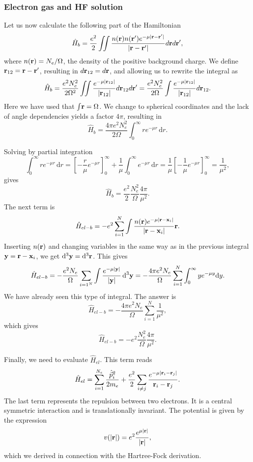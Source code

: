 \documentclass{beamer}
\begin{document}
\begin{frame}
\frametitle{Electron gas and HF solution}

\begin{block}{}
Let us now calculate the following part of the Hamiltonian
\[ \hat H_b = \frac{e^2}{2} \iint \frac{n({\bf r}) n({\bf r}')e^{-\mu|{\bf r} - {\bf r}'|}}{|{\bf r} - {\bf r}'|} d{\bf r} d{\bf r}' , 
\]
where $n({\bf r}) = N_e/\Omega$, the density of the positive background charge. We define ${\bf r}_{12} = {\bf r} - {\bf r}'$, resulting in $d{\bf r}_{12} = d{\bf r}$, and allowing us to rewrite the integral as
\[ 
\hat H_b = \frac{e^2 N_e^2}{2\Omega^2} \iint \frac{e^{-\mu |{\bf r}_{12}|}}{|{\bf r}_{12}|} d{\bf r}_{12} d{\bf r}' = \frac{e^2 N_e^2}{2\Omega} \int \frac{e^{-\mu |{\bf r}_{12}|}}{|{\bf r}_{12}|} d{\bf r}_{12} . 
\]
Here we have used that $\int \! {\bf r} = \Omega$. We change to spherical coordinates and the lack of angle 
dependencies yields a factor $4\pi$, resulting in
\[ 
\hat H_b = \frac{4\pi e^2 N_e^2}{2\Omega} \int_0^\infty re^{-\mu r} \, \mathrm{d} r . 
\]


Solving by partial integration
\[ \int_0^\infty re^{-\mu r} \, \mathrm{d} r = \left[ -\frac{r}{\mu} e^{-\mu r} \right]_0^\infty + \frac{1}{\mu} \int_0^\infty e^{-\mu r} \, \mathrm{d} r
= \frac{1}{\mu} \left[ - \frac{1}{\mu} e^{-\mu r} \right]_0^\infty = \frac{1}{\mu^2}, 
\]
gives
\[
\hat{H}_b = \frac{e^2}{2} \frac{N_e^2}{\Omega} \frac{4\pi}{\mu^2} .
\]
The next term is 
\[ 
\hat H_{el-b} = -e^2 \sum_{i = 1}^N \int \frac{n({\bf r}) e^{-\mu |{\bf r} - {\bf x}_i|}}{|{\bf r} - {\bf x}_i|} {\bf r} . 
\]
Inserting  $n({\bf r})$ and changing variables in the same way as in the previous integral ${\bf y} = {\bf r} - {\bf x}_i$, we get $\mathrm{d}^3 {\bf y} = \mathrm{d}^3 {\bf r}$. This gives
\[ 
\hat H_{el-b} = -\frac{e^2 N_e}{\Omega} \sum_{i = 1^N} \int \frac{e^{-\mu |{\bf y}|}}{|{\bf y}|} \, \mathrm{d}^3 {\bf y}
=  -\frac{4\pi e^2 N_e}{\Omega} \sum_{i = 1}^N \int_0^\infty y e^{-\mu y} \mathrm{d} y. 
\]
We have already seen this  type of integral. The answer is 
\[ 
\hat H_{el-b} = -\frac{4\pi e^2 N_e}{\Omega} \sum_{i = 1}^N \frac{1}{\mu^2}, 
\]
which gives
\[
\hat H_{el-b} = -e^2 \frac{N_e^2}{\Omega} \frac{4\pi}{\mu^2} .
\]

Finally, we need to evaluate $\hat H_{el}$. This term reads
\[ 
\hat H_{el} = \sum_{i=1}^{N_e} \frac{\hat{\vec p}_i^2}{2m_e} + \frac{e^2}{2} \sum_{i \neq j} \frac{e^{-\mu |{\bf r}_i - {\bf r}_j|}}{{\bf r}_i - {\bf r}_j} . 
\]
The last term represents the repulsion between two electrons. It is a central symmetric interaction
and is translationally invariant. The potential is given by the expression
\[ 
v(|{\bf r}|) = e^2 \frac{e^{\mu|{\bf r}|}}{|{\bf r}|}, 
\]
which we derived in connection with the Hartree-Fock derivation.


\end{block}
\end{frame}
\end{document}
